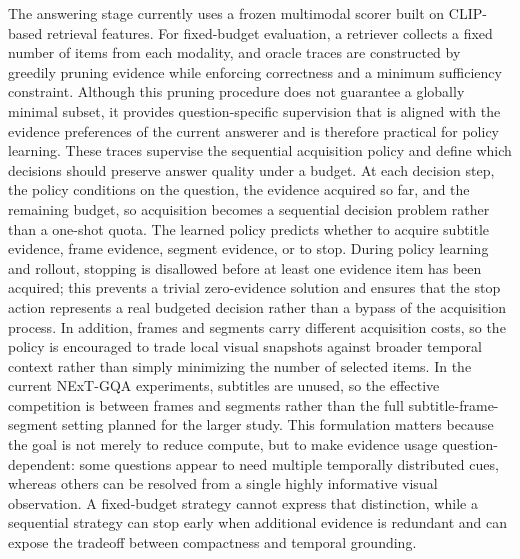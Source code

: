 \documentclass{article}
\begin{document}
The answering stage currently uses a frozen multimodal scorer built on CLIP-based retrieval features. For fixed-budget evaluation, a retriever collects a fixed number of items from each modality, and oracle traces are constructed by greedily pruning evidence while enforcing correctness and a minimum sufficiency constraint. Although this pruning procedure does not guarantee a globally minimal subset, it provides question-specific supervision that is aligned with the evidence preferences of the current answerer and is therefore practical for policy learning. These traces supervise the sequential acquisition policy and define which decisions should preserve answer quality under a budget. At each decision step, the policy conditions on the question, the evidence acquired so far, and the remaining budget, so acquisition becomes a sequential decision problem rather than a one-shot quota. The learned policy predicts whether to acquire subtitle evidence, frame evidence, segment evidence, or to stop. During policy learning and rollout, stopping is disallowed before at least one evidence item has been acquired; this prevents a trivial zero-evidence solution and ensures that the stop action represents a real budgeted decision rather than a bypass of the acquisition process. In addition, frames and segments carry different acquisition costs, so the policy is encouraged to trade local visual snapshots against broader temporal context rather than simply minimizing the number of selected items. In the current NExT-GQA experiments, subtitles are unused, so the effective competition is between frames and segments rather than the full subtitle-frame-segment setting planned for the larger study. This formulation matters because the goal is not merely to reduce compute, but to make evidence usage question-dependent: some questions appear to need multiple temporally distributed cues, whereas others can be resolved from a single highly informative visual observation. A fixed-budget strategy cannot express that distinction, while a sequential strategy can stop early when additional evidence is redundant and can expose the tradeoff between compactness and temporal grounding.
\end{document}

